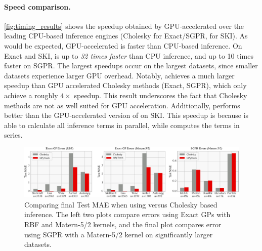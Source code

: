 \label{sec:results}
%

\paragraph{Speed comparison.}
\autoref{fig:timing_results} shows the speedup obtained by GPU-accelerated \mmacro{} over the leading CPU-based inference engines (Cholesky for Exact/SGPR, \citet{dong2017scalable} for SKI).
As would be expected, GPU-accelerated \mmacro{} is faster than CPU-based inference.
On Exact and SKI, \mmacro{} is up to \emph{32 times faster} than CPU inference, and up to 10 times faster on SGPR.
The largest speedups occur on the largest datasets, since smaller datasets experience larger GPU overhead.
Notably, \mmacro{} achieves a much larger speedup than GPU accelerated Cholesky methods (Exact, SGPR), which only achieve a roughly $4\times$ speedup.
This result underscores the fact that Cholesky methods are not as well suited for GPU acceleration.
Additionally, \mmacro{} performs better than the GPU-accelerated version of \cite{dong2017scalable} on SKI.
This speedup is because \mmacro{} is able to calculate all inference terms in parallel, while \cite{dong2017scalable} computes the terms in series.
%

\begin{figure}[t]
  \centering
  \includegraphics[width=\textwidth]{chapters/bbmm/figures/exact_gp_chol_vs_mvm}
  \caption{Comparing final Test MAE when using \mmacro{} versus Cholesky based inference. The left two plots compare errors using Exact GPs with RBF and Matern-5/2 kernels, and the final plot compares error using SGPR with a Matern-5/2 kernel on significantly larger datasets.}
  \label{fig:error_results}
\end{figure}

